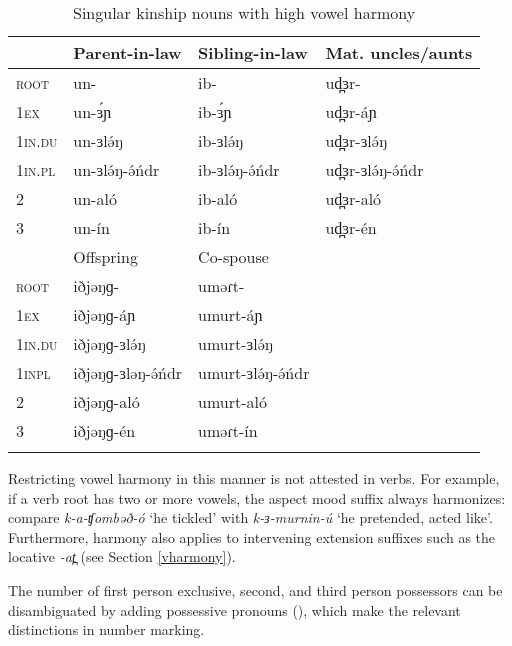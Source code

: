 \begin{table} 
\caption{Singular kinship nouns with high vowel harmony} \label{tab:ch7:kintable}
\begin{tabular}[t]{llll}
\lsptoprule
		& Parent-in-law	&	Sibling-in-law	&	Mat. uncles/aunts	\\
	\midrule
\textsc{root}	& un-	&ib-	&ud̪ɜr-	\\
\textsc{1ex} 		& un-ɜ́ɲ	&ib-ɜ́ɲ	&ud̪ɜr-áɲ		 \\
\textsc{1in.du}	& un-ɜlə́ŋ &	ib-ɜlə́ŋ &	ud̪ɜr-ɜlə́ŋ	\\
\textsc{1in.pl}	& un-ɜlə́ŋ-ə́ńdr	& ib-ɜlə́ŋ-ə́ńdr & ud̪ɜr-ɜlə́ŋ-ə́ńdr	\\
2		& un-aló	& ib-aló	& ud̪ɜr-aló	\\
3		& un-ín		& ib-ín		& ud̪ɜr-én	\\
	\midrule
	&	Offspring	&	Co-spouse & \\
	\midrule
\textsc{root}	&	iðjəŋɡ-			&	uməɾt-			& \\	 
\textsc{1ex}		&	iðjəŋɡ-áɲ		&	umurt-áɲ		& \\
\textsc{1in.du}	& iðjəŋɡ-ɜlə́ŋ		&	umurt-ɜlə́ŋ	 	& \\
\textsc{1inpl}	& iðjəŋɡ-ɜləŋ-ə́ńdr	&	umurt-ɜlə́ŋ-ə́ńdr	& \\
2		&	iðjəŋɡ-aló		&	umurt-aló	 	& \\
3		&	iðjəŋɡ-én		&	uməɾt-ín		& \\
	\lspbottomrule
\end{tabular}	
\end{table}
	
Restricting vowel harmony in this manner is not attested in verbs. For example, if a verb root has two or more vowels, the aspect mood suffix always harmonizes: compare \textit{k-a-ʧombəð-ó} `he tickled’ with \textit{k-ɜ-murnin-ú} `he pretended, acted like’. Furthermore, harmony also applies to intervening extension suffixes such as the locative \textit{-at̪} (see Section \ref{vharmony}). %

The number of first person exclusive, second, and third person possessors can be disambiguated by adding possessive pronouns (), which make the relevant distinctions in number marking.

